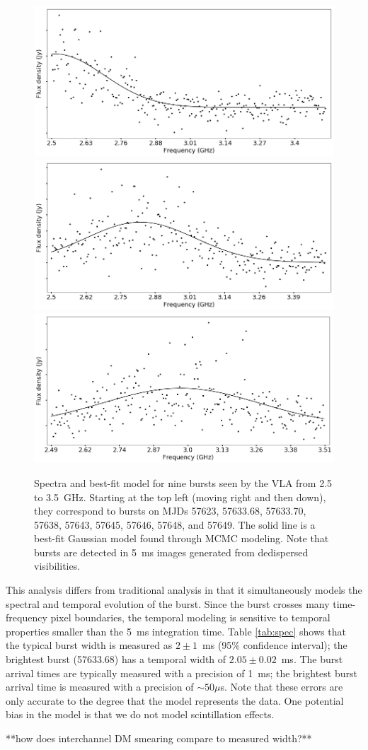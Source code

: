 \documentclass[twocolumn]{aastex61}
\begin{document}
\begin{figure}[ht]
\begin{center}
 \begin{minipage}{2\columnwidth}
  \includegraphics[width=0.33\columnwidth]{spec_57646.png}
  \includegraphics[width=0.33\columnwidth]{spec_57648.png}
  \includegraphics[width=0.33\columnwidth]{spec_57649.png}
 \end{minipage}
\caption{Spectra and best-fit model for nine bursts seen by the VLA from 2.5 to 3.5~GHz. Starting at the top left (moving right and then down), they correspond to bursts on MJDs 57623, 57633.68, 57633.70, 57638, 57643, 57645, 57646, 57648, and 57649. The solid line is a best-fit Gaussian model found through MCMC modeling. Note that bursts are detected in 5~ms images generated from dedispersed visibilities.
\label{fig:spec}}
\end{center}
\end{figure}

This analysis differs from traditional analysis in that it simultaneously models the spectral and temporal evolution of the burst. Since the burst crosses many time-frequency pixel boundaries, the temporal modeling is sensitive to temporal properties smaller than the 5~ms integration time. Table \ref{tab:spec} shows that the typical burst width is measured as $2\pm1$~ms (95\% confidence interval); the brightest burst (57633.68) has a temporal width of $2.05\pm0.02$~ms. The burst arrival times are typically measured with a precision of 1~ms; the brightest burst arrival time is measured with a precision of $\sim50\mu$s. Note that these errors are only accurate to the degree that the model represents the data. One potential bias in the model is that we do not model scintillation effects.

**how does interchannel DM smearing compare to measured width?**
\end{document}
